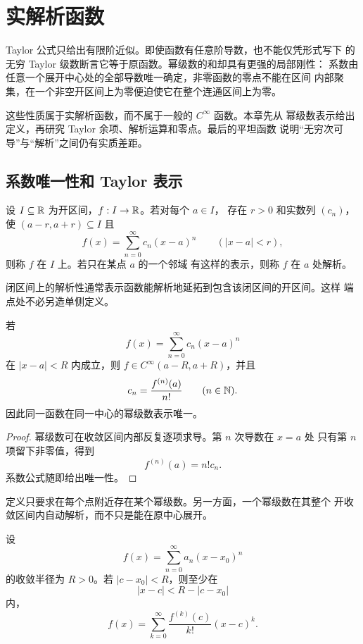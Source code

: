 \chapter{实解析函数}
\label{chap:real-analytic-functions}

Taylor 公式只给出有限阶近似。即使函数有任意阶导数，也不能仅凭形式写下
的无穷 Taylor 级数断言它等于原函数。幂级数的和却具有更强的局部刚性：
系数由任意一个展开中心处的全部导数唯一确定，非零函数的零点不能在区间
内部聚集，在一个非空开区间上为零便迫使它在整个连通区间上为零。

这些性质属于实解析函数，而不属于一般的 \(C^\infty\) 函数。本章先从
幂级数表示给出定义，再研究 Taylor 余项、解析运算和零点。最后的平坦函数
说明“无穷次可导”与“解析”之间仍有实质差距。

\section{系数唯一性和 Taylor 表示}

\begin{definition}[实解析函数]
设 \(I\subseteq\mathbb{R}\) 为开区间，\(f:I\to\mathbb{R}\)。若对每个 \(a\in I\)，
存在 \(r>0\) 和实数列 \((c_n)\)，使
\((a-r,a+r)\subseteq I\) 且
\[
 f(x)=\sum_{n=0}^\infty c_n(x-a)^n
 \qquad(|x-a|<r),
\]
则称 \(f\) 在 \(I\) 上。若只在某点 \(a\) 的一个邻域
有这样的表示，则称 \(f\) 在 \(a\) 处解析。
\end{definition}

闭区间上的解析性通常表示函数能解析地延拓到包含该闭区间的开区间。这样
端点处不必另造单侧定义。

\begin{theorem}[幂级数系数公式]
\label{thm:analytic-coefficient-formula}
若
\[
 f(x)=\sum_{n=0}^\infty c_n(x-a)^n
\]
在 \(|x-a|<R\) 内成立，则 \(f\in C^\infty(a-R,a+R)\)，并且
\[
 c_n=\frac{f^{(n)}(a)}{n!}\qquad(n\in\mathbb{N}).
\]
因此同一函数在同一中心的幂级数表示唯一。
\end{theorem}

\begin{proof}
幂级数可在收敛区间内部反复逐项求导。第 \(n\) 次导数在 \(x=a\) 处
只有第 \(n\) 项留下非零值，得到
\[
 f^{(n)}(a)=n!c_n.
\]
系数公式随即给出唯一性。
\end{proof}

定义只要求在每个点附近存在某个幂级数。另一方面，一个幂级数在其整个
开收敛区间内自动解析，而不只是能在原中心展开。

\begin{theorem}[幂级数的重新定心]
\label{thm:power-series-recentering}
设
\[
 f(x)=\sum_{n=0}^\infty a_n(x-x_0)^n
\]
的收敛半径为 \(R>0\)。若 \(|c-x_0|<R\)，则至少在
\[
 |x-c|<R-|c-x_0|
\]
内，
\[
 f(x)=\sum_{k=0}^\infty\frac{f^{(k)}(c)}{k!}(x-c)^k.
\]
\end{theorem}

